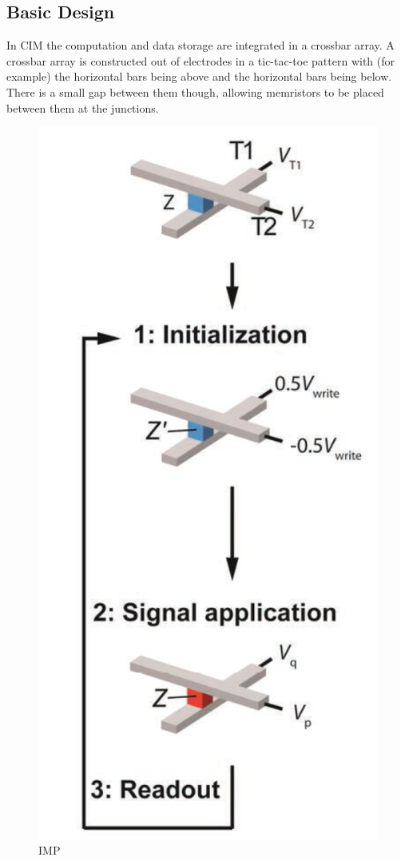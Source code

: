 \documentclass{sig-alternate}
\begin{document}
\subsection{Basic Design}
In CIM the computation and data storage are integrated in a crossbar array.  A crossbar array is constructed out of electrodes in a tic-tac-toe pattern with (for example) the horizontal bars being above and the horizontal bars being below.  There is a small gap between them though, allowing memristors to be placed between them at the junctions.

\begin{figure}
  \begin{center}
  \includegraphics[scale=.2]{inmemcrossbar.png}
  \caption{IMP}
  \end{center}
  \label{fig:inmemcrossbar}
\end{figure}
\end{document}
